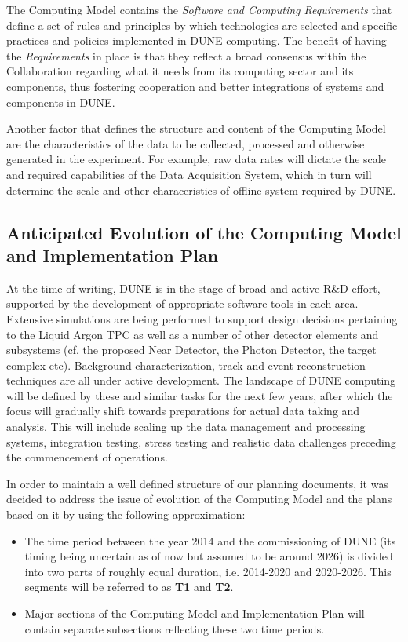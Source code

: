 The Computing Model contains the \textit{Software and Computing Requirements} that define a set of rules and principles by which technologies
are selected and specific practices and policies implemented in DUNE computing. The benefit of having the \textit{Requirements} in place is that they reflect a broad consensus
within the Collaboration regarding what it needs from its computing sector and its components, thus fostering cooperation and better
integrations of systems and components in DUNE.

Another factor that defines the structure and content of the Computing Model are the characteristics of the data to be collected,
processed and otherwise generated in the experiment. For example, raw data rates will dictate the scale and required capabilities
of the Data Acquisition System, which in turn will determine the scale and other characeristics of offline system required by DUNE.



\subsection{Anticipated Evolution of the Computing Model and Implementation Plan}

At the time of writing, DUNE is in the stage of broad and active R\&D effort, supported by the development of appropriate 
software tools in each area. Extensive simulations are being performed to support design decisions pertaining to the Liquid 
Argon TPC as well as a number of other detector elements and subsystems (cf. the proposed Near Detector, the Photon Detector, 
the target complex etc). Background characterization, track and event reconstruction techniques are all under active development. 
The landscape of DUNE computing will be defined by these and similar tasks for  the next few years, after which the focus will 
gradually shift towards preparations for actual data taking and analysis. 
This will include scaling up the data management and processing systems, integration testing, 
stress testing and  realistic data challenges preceding the commencement of operations.

In order to maintain a well defined structure of our planning documents, it was decided to address the issue of evolution of the Computing Model 
and the plans based on it by using the following approximation:

\begin{itemize}

\item The time period between the year 2014 and the commissioning of DUNE (its timing being uncertain as of now but assumed to be around 2026) is divided into two parts of roughly equal duration, i.e. 2014-2020 and 2020-2026. This segments will be referred to as \textbf{T1} and \textbf{T2}.


\item Major sections of the Computing Model and Implementation Plan will contain separate subsections reflecting these two time periods.

\end{itemize}
 
